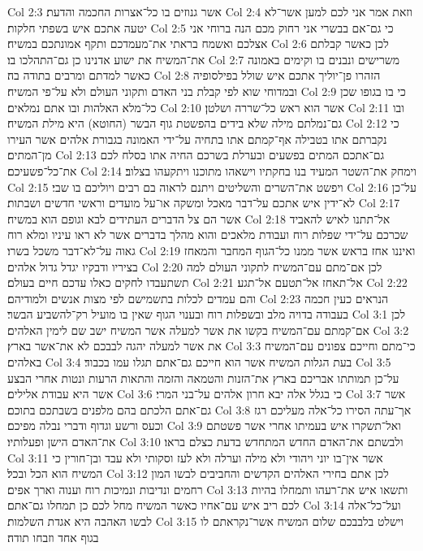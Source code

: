 Col 2:3  אשר גנוזים בו כל־אצרות החכמה והדעת׃
Col 2:4  וזאת אמר אני לכם למען אשר־לא יטעה אתכם איש בשפתי חלקות׃
Col 2:5  כי גם־אם בבשרי אני רחוק מכם הנה ברוחי אני אצלכם ואשמח בראתי את־מעמדכם ותקף אמונתכם במשיח׃
Col 2:6  לכן כאשר קבלתם את־המשיח את ישוע אדנינו כן גם־התהלכו בו׃
Col 2:7  משרישים ונבנים בו וקימים באמונה כאשר למדתם ומרבים בתודה בה׃
Col 2:8  הזהרו פן־יוליך אתכם איש שולל בפילסופיה ובמדוחי שוא לפי קבלת בני האדם ותקוני העולם ולא על־פי המשיח׃
Col 2:9  כי בו בגופו שכן כל־מלא האלהות ובו אתם נמלאים׃
Col 2:10  אשר הוא ראש כל־שררה ושלטן׃
Col 2:11  ובו גם־נמלתם מילה שלא בידים בהפשטת גוף הבשר (החוטא) היא מילת המשיח׃
Col 2:12  כי נקברתם אתו בטבילה אף־קמתם אתו בתחיה על־ידי האמונה בגבורת אלהים אשר העירו מן־המתים׃
Col 2:13  גם־אתכם המתים בפשעים ובערלת בשרכם החיה אתו בסלח לכם את־כל־פשעיכם׃
Col 2:14  וימחק את־השטר המעיד בנו בחקתיו וישאהו מתוכנו ויתקעהו בצלוב׃
Col 2:15  ויפשט את־השרים והשליטים ויתנם לראוה בם רבים ויוליכם בו שבי׃
Col 2:16  על־כן לא־ידין איש אתכם על־דבר מאכל ומשקה או־על מועדים וראשי חדשים ושבתות׃
Col 2:17  אשר הם צל הדברים העתידים לבא וגופם הוא במשיח׃
Col 2:18  אל־תתנו לאיש להאביד שכרכם על־ידי שפלות רוח ועבודת מלאכים והוא מהלך בדברים אשר לא ראו עיניו ומלא רוח גאוה על־לא־דבר משכל בשרו׃
Col 2:19  ואיננו אחז בראש אשר ממנו כל־הגוף המחבר והמאחז בציריו ודבקיו יגדל גדול אלהים׃
Col 2:20  לכן אם־מתם עם־המשיח לתקוני העולם למה תשתעבדו לחקים כאלו עדכם חיים בעולם׃
Col 2:21  אל־תאחז אל־תטעם אל־תגע׃
Col 2:22  והם עמדים לכלות בתשמישם לפי מצות אנשים ולמודיהם׃
Col 2:23  הנראים כעין חכמה בעבודה בדויה מלב ובשפלות רוח ובענוי הגוף שאין בו מועיל רק־להשביע הבשר׃
Col 3:1  לכן אם־קמתם עם־המשיח בקשו את אשר למעלה אשר המשיח ישב שם לימין האלהים׃
Col 3:2  את אשר למעלה יהגה לבבכם לא את־אשר בארץ׃
Col 3:3  כי־מתם וחייכם צפונים עם־המשיח באלהים׃
Col 3:4  בעת הגלות המשיח אשר הוא חייכם גם־אתם תגלו עמו בכבוד׃
Col 3:5  על־כן תמותתו אבריכם בארץ את־הזנות והטמאה והזמה והתאות הרעות ונטות אחרי הבצע אשר היא עבודת אלילים׃
Col 3:6  כי בגלל אלה יבא חרון אלהים על־בני המרי׃
Col 3:7  אשר גם־אתם הלכתם בהם מלפנים בשבתכם בתוכם׃
Col 3:8  אך־עתה הסירו כל־אלה מעליכם רגז וכעס ורשע וגדוף ודברי נבלה מפיכם׃
Col 3:9  ואל־תשקרו איש בעמיתו אחרי אשר פשטתם את־האדם הישן ופעלותיו׃
Col 3:10  ולבשתם את־האדם החדש המתחדש בדעת כצלם בראו׃
Col 3:11  אשר אין־בו יוני ויהודי ולא מילה וערלה ולא לעז וסקותי ולא עבד ובן־חורין כי המשיח הוא הכל ובכל׃
Col 3:12  לכן אתם בחירי האלהים הקדשים והחביבים לבשו המון רחמים ונדיבות ונמיכות רוח וענוה וארך אפים׃
Col 3:13  ותשאו איש את־רעהו ותמחלו בהיות לכם ריב איש עם־אחיו כאשר המשיח מחל לכם כן תמחלו גם־אתם׃
Col 3:14  ועל־כל־אלה לבשו האהבה היא אגדת השלמות׃
Col 3:15  וישלט בלבבכם שלום המשיח אשר־נקראתם לו בגוף אחד וזבחו תודה׃
